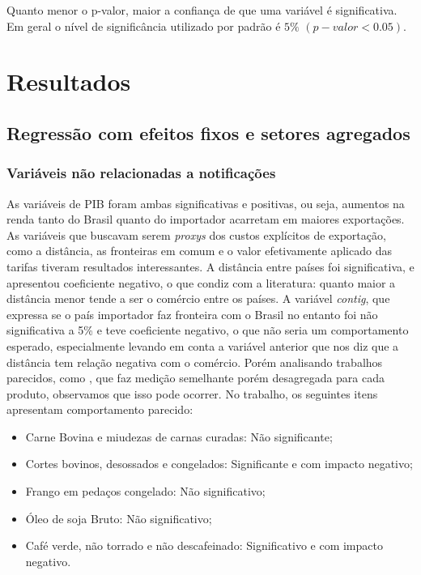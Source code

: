 \documentclass[12pt, a4paper]{article}
\begin{document}
Quanto menor o p-valor, maior a confiança de que uma variável é significativa. Em geral o nível de significância utilizado por padrão é $5\%$ $(p-valor < 0.05)$.


\newpage
\section{Resultados}

\subsection{Regressão com efeitos fixos e setores agregados}



\subsubsection{Variáveis não relacionadas a notificações}

As variáveis de PIB foram ambas significativas e positivas, ou seja, aumentos na renda tanto do Brasil quanto do importador acarretam em maiores exportações. As variáveis que buscavam serem \emph{proxys} dos custos explícitos de exportação, como a distância, as fronteiras em comum e o valor efetivamente aplicado das tarifas tiveram resultados interessantes. A distância entre países foi significativa, e apresentou coeficiente negativo, o que condiz com a literatura: quanto maior a distância menor tende a ser o comércio entre os países. A variável \emph{contig}, que expressa se o país importador faz fronteira com o Brasil no entanto foi não significativa a 5\% e teve coeficiente negativo, o que não seria um comportamento esperado, especialmente levando em conta a variável anterior que nos diz que a distância tem relação negativa com o comércio. Porém analisando trabalhos parecidos, como \cite{ALMEIDA2014}, que faz medição semelhante porém desagregada para cada produto, observamos que isso pode ocorrer. No trabalho, os seguintes itens apresentam comportamento parecido:

\begin{itemize}
    \item Carne Bovina e miudezas de carnas curadas: Não significante;
    \item Cortes bovinos, desossados e congelados: Significante e com impacto negativo;
    \item Frango em pedaços congelado: Não significativo;
    \item Óleo de soja Bruto: Não significativo;
    \item Café verde, não torrado e não descafeinado: Significativo e com impacto negativo.
\end{itemize}
\end{document}
